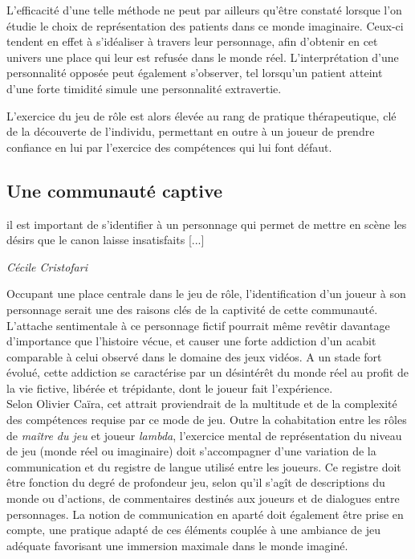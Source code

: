 L'efficacité d'une telle méthode ne peut par ailleurs qu'être constaté lorsque l'on étudie le choix de représentation des patients dans ce monde imaginaire. Ceux-ci tendent en effet à s'idéaliser à travers leur personnage, afin d'obtenir en cet univers une place qui leur est refusée dans le monde réel. L'interprétation d'une personnalité opposée peut également s'observer, tel lorsqu'un patient atteint d'une forte timidité simule une personnalité extravertie.

L'exercice du jeu de rôle est alors élevée au rang de pratique thérapeutique, clé de la découverte de l'individu, permettant en outre à un joueur de prendre confiance en lui par l'exercice des compétences qui lui font défaut.



\subsection{Une communauté captive}

\begin{shadequote}
[...] il est important de s’identifier à un personnage qui permet de mettre en scène les désirs que le canon laisse insatisfaits [...]
\par\emph{C{\'e}cile Cristofari}
\end{shadequote}

Occupant une place centrale dans le jeu de rôle, l'identification d'un joueur à son personnage serait une des raisons clés de la captivité de cette communauté. L'attache sentimentale à ce personnage fictif pourrait même revêtir davantage d'importance que l'histoire vécue, et causer une forte addiction d'un acabit comparable à celui observé dans le domaine des jeux vidéos. A un stade fort évolué, cette addiction se caractérise par un désintérêt du monde réel au profit de la vie fictive, libérée et trépidante, dont le joueur fait l'expérience.\\


Selon Olivier Caïra\cite{caira2007jeux}, cet attrait proviendrait de la multitude et de la complexité des compétences requise par ce mode de jeu. Outre la cohabitation entre les rôles de \textit{maître du jeu} et joueur \textit{lambda}, l'exercice mental de représentation du niveau de jeu (monde réel ou imaginaire) doit s'accompagner d'une variation de la communication et du registre de langue utilisé entre les joueurs. Ce registre doit être fonction du degré de profondeur jeu, selon qu'il s'agît de descriptions du monde ou d'actions, de commentaires destinés aux joueurs et de dialogues entre personnages. La notion de communication en aparté doit également être prise en compte, une pratique adapté de ces éléments couplée à une ambiance de jeu adéquate favorisant une immersion maximale dans le monde imaginé.


